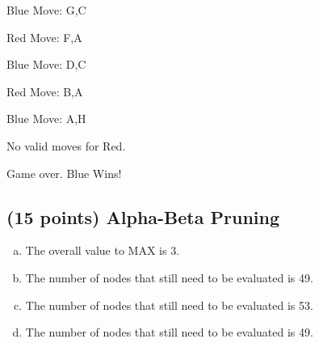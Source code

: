 \documentclass{article}
\begin{document}
	Blue Move: G,C
	
	Red Move: F,A
	
	Blue Move: D,C
	
	Red Move: B,A
	
	Blue Move:  A,H
	
	No valid moves for Red. 
	
	Game over. Blue Wins!
	\subsection{(15 points) Alpha-Beta Pruning}
	\begin{enumerate}[(a)]
		\item The overall value to MAX is 3. 
		\item The number of nodes that still need to be evaluated is 49.
		\item The number of nodes that still need to be evaluated is 53.
		\item The number of nodes that still need to be evaluated is 49.
	\end{enumerate}
	\setcounter{section}{3}
\end{document}
